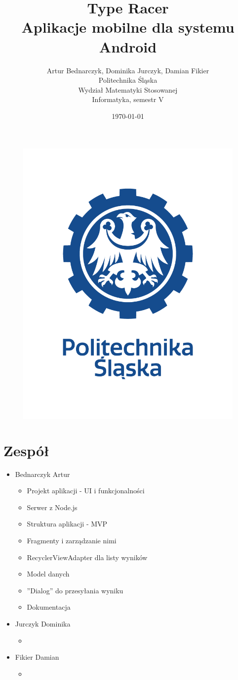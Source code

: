 \documentclass[12pt,a4paper]{article}
\title{Type Racer\\Aplikacje mobilne dla systemu Android}
\author{Artur Bednarczyk, Dominika Jurczyk, Damian Fikier\\Politechnika Śląska\\Wydział Matematyki Stosowanej\\Informatyka, semestr V}
\date{\today}
\begin{document}
	\maketitle
	\begin{figure}[H]
		\centering
		\includegraphics[width=0.5\linewidth]{logo2}
		\label{fig:logo}
	\end{figure}
	\clearpage
	\tableofcontents
	\clearpage
	\section{Zespół}
	\begin{itemize}
	    \item Bednarczyk Artur \begin{itemize}
	        \item Projekt aplikacji - UI i funkcjonalności
	        \item Serwer z Node.js
	        \item Struktura aplikacji - MVP
	        \item Fragmenty i zarządzanie nimi
	        \item RecyclerViewAdapter dla listy wyników
	        \item Model danych
	        \item ''Dialog'' do przesyłania wyniku
	        \item Dokumentacja
	    \end{itemize}
	    \item Jurczyk Dominika \begin{itemize}
	        \item 
	    \end{itemize}
	    \item Fikier Damian \begin{itemize}
	        \item 
	    \end{itemize}
	\end{itemize}
	\clearpage
\end{document}
